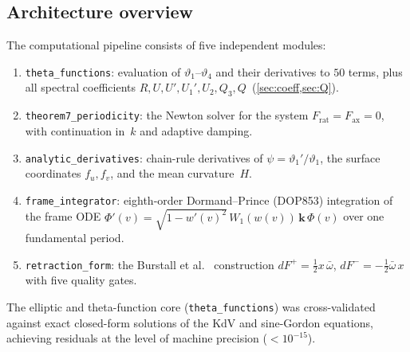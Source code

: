 \documentclass[11pt,a4paper]{article}
\theoremstyle{plain}
\theoremstyle{definition}
\theoremstyle{remark}
\newcommand{\vt}[1]{\vartheta_{#1}}     %
\begin{document}
\subsection{Architecture overview}\label{sec:arch}
The computational pipeline consists of five independent modules:
\begin{enumerate}[nosep]
\item \texttt{theta\_functions}: evaluation of
  $\vt{1}$--$\vt{4}$ and their derivatives to $50$ terms,
  plus all spectral coefficients
  $R, U, U', U_1', U_2, Q_3, Q$~(\cref{sec:coeff,sec:Q}).
\item \texttt{theorem7\_periodicity}: the Newton solver for
  the system $F_{\mathrm{rat}} = F_{\mathrm{ax}} = 0$,
  with continuation in~$k$ and adaptive damping.
\item \texttt{analytic\_derivatives}: chain-rule derivatives
  of $\psi = \vt{1}'/\vt{1}$, the surface coordinates
  $f_u, f_v$, and the mean curvature~$H$.
\item \texttt{frame\_integrator}: eighth-order Dormand--Prince
  (DOP853) integration of the frame ODE
  $\Phi'(v) = \sqrt{1 - w'(v)^2}\,W_1(w(v))\,\mathbf{k}\,\Phi(v)$
  over one fundamental period.
\item \texttt{retraction\_form}: the Burstall et al.~\cite{BCHR25}
  construction $dF^+ = \tfrac12 x\,\bar\omega$,
  $dF^- = -\tfrac12 \bar{\omega}\,x$ with five quality gates.
\end{enumerate}
The elliptic and theta-function core (\texttt{theta\_functions})
was cross-validated against exact closed-form solutions of the
KdV and sine-Gordon equations, achieving residuals at the level
of machine precision ($< 10^{-15}$).
\end{document}
